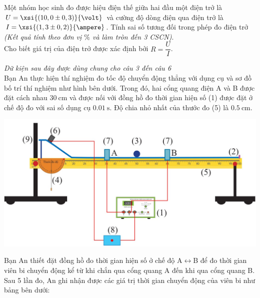 \begin{ex}
\end{ex}
\begin{ex}
	Một nhóm học sinh đo được hiệu điện thế giữa hai đầu một điện trở là $U=\xsi{\left(10,0\pm0,3\right)}{\volt}$ và cường độ dòng điện qua điện trở là $I=\xsi{\left(1,3\pm0,2\right)}{\ampere}$. Tính sai số tương đối trong phép đo điện trở \textit{(Kết quả tính theo đơn vị $\si{\percent}$ và làm tròn đến 3 CSCN)}.\\
	Cho biết giá trị của điện trở được xác định bởi $R=\dfrac{U}{I}$.
\end{ex}
\textit{Dữ kiện sau đây được dùng chung cho câu 3 đến câu 6}\\
Bạn An thực hiện thí nghiệm đo tốc độ chuyển động thẳng với dụng cụ và sơ đồ bố trí thí nghiệm như hình bên dưới.
Trong đó, hai cổng quang điện A và B được đặt cách nhau $\SI{30}{\centi\meter}$ và được nối với đồng hồ đo thời gian hiện số (1) được đặt ở chế độ đo với sai số dụng cụ $\SI{0.01}{\second}$. Độ chia nhỏ nhất của thước đo (5) là $\SI{0.5}{\centi\meter}$.
\begin{center}
	\includegraphics[width=0.75\linewidth]{../figs/G10-CHUONG1-3}
\end{center}
Bạn An thiết đặt đồng hồ đo thời gian hiện số ở chế độ A$\leftrightarrow$B để đo thời gian viên bi chuyển động kể từ khi chắn qua cổng quang A đến khi qua cổng quang B. Sau 5 lần đo, An ghi nhận được các giá trị thời gian chuyển động của viên bi như bảng bên dưới:
